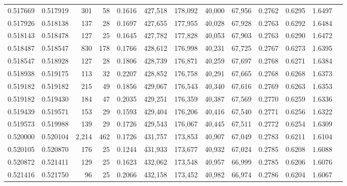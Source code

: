 \begin{tabular}{rrrrrrrrrrrrr}
0.517669 & 0.517919 &   301 &  58 &                                     0.1616 & 427,518 & 178,092 &  40,000 &  67,956 & 0.2762 & 0.6295 & 1.6497 \\
0.517926 & 0.518138 &   137 &  28 &                                     0.1697 & 427,655 & 177,955 &  40,028 &  67,928 & 0.2763 & 0.6292 & 1.6484 \\
0.518143 & 0.518478 &   127 &  25 &                                     0.1645 & 427,782 & 177,828 &  40,053 &  67,903 & 0.2763 & 0.6290 & 1.6472 \\
0.518487 & 0.518547 &   830 & 178 &                                     0.1766 & 428,612 & 176,998 &  40,231 &  67,725 & 0.2767 & 0.6273 & 1.6395 \\
0.518547 & 0.518928 &   127 &  28 &                                     0.1806 & 428,739 & 176,871 &  40,259 &  67,697 & 0.2768 & 0.6271 & 1.6384 \\
0.518938 & 0.519175 &   113 &  32 &                                     0.2207 & 428,852 & 176,758 &  40,291 &  67,665 & 0.2768 & 0.6268 & 1.6373 \\
0.519182 & 0.519182 &   215 &  49 &                                     0.1856 & 429,067 & 176,543 &  40,340 &  67,616 & 0.2769 & 0.6263 & 1.6353 \\
0.519182 & 0.519430 &   184 &  47 &                                     0.2035 & 429,251 & 176,359 &  40,387 &  67,569 & 0.2770 & 0.6259 & 1.6336 \\
0.519439 & 0.519571 &   153 &  29 &                                     0.1593 & 429,404 & 176,206 &  40,416 &  67,540 & 0.2771 & 0.6256 & 1.6322 \\
0.519573 & 0.519988 &   139 &  29 &                                     0.1726 & 429,543 & 176,067 &  40,445 &  67,511 & 0.2772 & 0.6254 & 1.6309 \\
0.520000 & 0.520104 & 2,214 & 462 &                                     0.1726 & 431,757 & 173,853 &  40,907 &  67,049 & 0.2783 & 0.6211 & 1.6104 \\
0.520105 & 0.520870 &   176 &  25 &                                     0.1244 & 431,933 & 173,677 &  40,932 &  67,024 & 0.2785 & 0.6208 & 1.6088 \\
0.520872 & 0.521411 &   129 &  25 &                                     0.1623 & 432,062 & 173,548 &  40,957 &  66,999 & 0.2785 & 0.6206 & 1.6076 \\
0.521416 & 0.521750 &    96 &  25 &                                     0.2066 & 432,158 & 173,452 &  40,982 &  66,974 & 0.2786 & 0.6204 & 1.6067 \\

\end{tabular}
